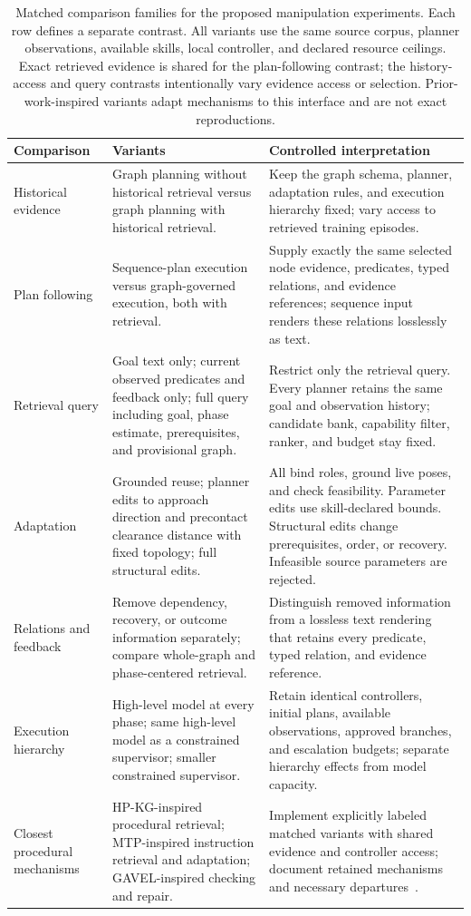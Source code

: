 \begin{table}[t]
\centering
\small
\caption{Matched comparison families for the proposed manipulation experiments. Each row defines a separate contrast. All variants use the same source corpus, planner observations, available skills, local controller, and declared resource ceilings. Exact retrieved evidence is shared for the plan-following contrast; the history-access and query contrasts intentionally vary evidence access or selection. Prior-work-inspired variants adapt mechanisms to this interface and are not exact reproductions.}
\label{tab:comparison-design}
\begin{tabularx}{\textwidth}{@{}p{}XX@{}}
\toprule
Comparison & Variants & Controlled interpretation \\
\midrule
Historical evidence & Graph planning without historical retrieval versus graph planning with historical retrieval. & Keep the graph schema, planner, adaptation rules, and execution hierarchy fixed; vary access to retrieved training episodes. \\
Plan following & Sequence-plan execution versus graph-governed execution, both with retrieval. & Supply exactly the same selected node evidence, predicates, typed relations, and evidence references; sequence input renders these relations losslessly as text. \\
Retrieval query & Goal text only; current observed predicates and feedback only; full query including goal, phase estimate, prerequisites, and provisional graph. & Restrict only the retrieval query. Every planner retains the same goal and observation history; candidate bank, capability filter, ranker, and budget stay fixed. \\
Adaptation & Grounded reuse; planner edits to approach direction and precontact clearance distance with fixed topology; full structural edits. & All bind roles, ground live poses, and check feasibility. Parameter edits use skill-declared bounds. Structural edits change prerequisites, order, or recovery. Infeasible source parameters are rejected. \\
Relations and feedback & Remove dependency, recovery, or outcome information separately; compare whole-graph and phase-centered retrieval. & Distinguish removed information from a lossless text rendering that retains every predicate, typed relation, and evidence reference. \\
Execution hierarchy & High-level model at every phase; same high-level model as a constrained supervisor; smaller constrained supervisor. & Retain identical controllers, initial plans, available observations, approved branches, and escalation budgets; separate hierarchy effects from model capacity. \\
Closest procedural mechanisms & HP-KG-inspired procedural retrieval; MTP-inspired instruction retrieval and adaptation; GAVEL-inspired checking and repair. & Implement explicitly labeled matched variants with shared evidence and controller access; document retained mechanisms and necessary departures~\cite{hpkg2025,mtp2025,gavel2026}. \\
\bottomrule
\end{tabularx}
\end{table}

